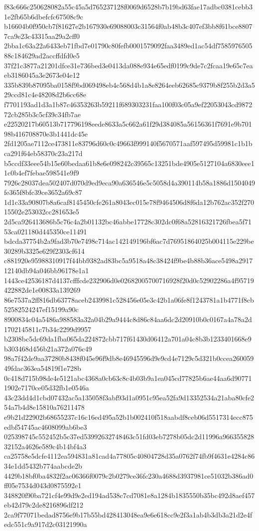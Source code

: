 {f83c666c250628082a55c45a5d765237128f0069d6528b7b19bd63fae17adbc0381cebb31e2fb65b6dbefcfc67508c9c
b16604b0f950cb7f81627e2b167930e69088003c31564f0ab48b3c407ef3bb8f61bce88077ca9e23c43315aa29a2cff0
2bba1c63a22a6433eb71fbd7e01790c80fefb0001579092faa3489ed1ac54df758597650588c184629ad2accffdfd0e5
37f21c3877a21201dfce31e736bed3e0413da088e934e65edf0199c9de7c2fcaa19e65c7eaeb3186045a3e2673e04e12
335b839b87095ba0158f9bd069498eb4c568d4b1a8e8264eeb62685c9379b8f255b2d3a529ccd81c4e48208d2b6cc68e
f7701193ad1d3a1b87c46353263b59211f689303231faa100f03c05a9ef22053043cd987272cb285b3c5cf39c34fb7ae
e22520217b60513b717796198eede8633a5c662a61f29d384085a56156361f7691e9b70198b416708870e3b1441dc45e
2fd1205ae7112ce473811e83796d60c0c49663f999140f5670571aaf597495d59981c1b1bca291f64eb58370c23a217d
b5ccdf33eee54b15e60bedaa61b8e6e098242c39565c13251bde4905e5127104a6830eee11c0b4ef7febae598541e9f9
7926c28037dea502407d070d9ed9eca90a636546e5c5058d4a390114b58a1886d1504049fe365f8bfc39ce3652a69c87
1d1c33a90807b8a6caf8145450cfe261a8043ec015e78f9464506d8f6da12b762ac352f27015502e253032cc281653e5
2d5ca926413686b5c76c4a2b01132bc46abbe17728c302dc0f68a52816321726fbea5f7153ca021180d445350ce11491
bdcda37754b2a9fad3b70e7498c714ac142149196bf6ac7d76951864025b004115e229be30289b3325e629f2303cf614
c881920e95988310917f44bb9382ad83bc5a9518a48c38424f9be4b88b36ace5498a291712140db94a046bb96178e1a1
1443ce42536187d4137cfffcde232906d0e02682005700716928f20d0c52902286a4f95719422882de1e00833a139269
86e7537a2ff816db63778aceb2439981c528456e05e3c42b1a06fe8f1243781a1b4771f8cb52582524247ef15199a90c
8900834c04a5486a988583a32a04b29a9444c8d86c84aa6dc2d20910b0c0167a4a78a2d1702145811c7b34c2299d9957
b2308bc5dc69da1fba065da224872cbb717f61430d06412a701a04c8b3b1233401668e9b303468d456b21a372a076c49
98a7f42de9aa37280b8438f045e96f9db8e46945596d9e9cd4e7129c5d321b0ccea26005949fdac363ea54819f1e728b
0c418d715b98de4e5121abc4368a0cb63c8c4b03b9a1ea045cd77825b6ae44aa6d907711902e7170ce05d32fb1e0546a
43c23dd4d1cbd07432ac5a135058f3abf93d1a0951c95ea52fa9d13352534a21aba80cfe254a7b4d8e15810a76211478
e9b21d22902b68655237c16c16ed495a52b1b002410f518aabdf8ceb06d5517314ecc875edbf54745ac4608099ab6be3
025398745c552452b5c37ed53992632748463c51fd03eb7278b05dc2d11996a96635582832152a4626e589c4b14bf4a3
ca25758e5dcfe4112ea594831a81cad4a77805c40804728d35a0762f74fb9f4631e4284c8634e1dd5432b774aabcde2b
4429b18bf0ba4832f2ac06366f0079c2b0279ce36fc230a4688d3937981ce51032b386ad0ff05e7534d043d0875592e1
348820f90ba721cf4e99d9e2ed194ad538c7cd7081e8a1284b1835550b35bc492d8aef457eb42d79c2de8216896df212
2ca9f77071bedad8756e9b17b55bd428413048ea9e6e618cc9e2f3a1ab4b3db3a21d2e4fedc551c9a917d2c03121990a
}
